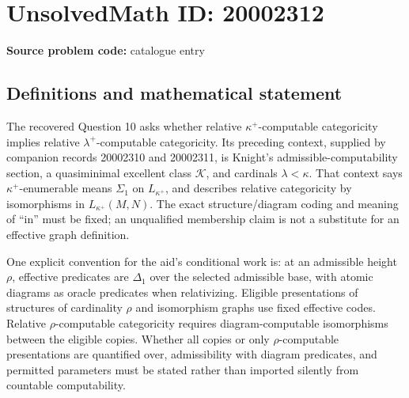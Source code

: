 \documentclass[11pt]{article}
\begin{document}
\section*{UnsolvedMath ID: 20002312}
\textbf{Source problem code:} catalogue entry
\subsection{Definitions and mathematical statement}
The recovered Question 10 asks whether relative \(\kappa^+\)-computable categoricity implies relative \(\lambda^+\)-computable categoricity. Its preceding context, supplied by companion records 20002310 and 20002311, is Knight's admissible-computability section, a quasiminimal excellent class \(\mathcal K\), and cardinals \(\lambda<\kappa\). That context says \(\kappa^+\)-enumerable means \(\Sigma_1\) on \(L_{\kappa^+}\), and describes relative categoricity by isomorphisms in \(L_{\kappa^+}(M,N)\). The exact structure/diagram coding and meaning of ``in'' must be fixed; an unqualified membership claim is not a substitute for an effective graph definition.

One explicit convention for the aid's conditional work is: at an admissible height \(\rho\), effective predicates are \(\Delta_1\) over the selected admissible base, with atomic diagrams as oracle predicates when relativizing. Eligible presentations of structures of cardinality \(\rho\) and isomorphism graphs use fixed effective codes. Relative \(\rho\)-computable categoricity requires diagram-computable isomorphisms between the eligible copies. Whether all copies or only \(\rho\)-computable presentations are quantified over, admissibility with diagram predicates, and permitted parameters must be stated rather than imported silently from countable computability.
\end{document}
